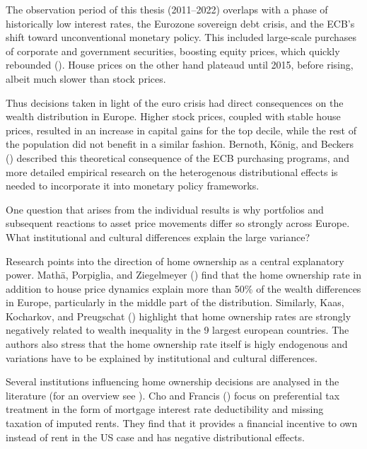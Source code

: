 \documentclass[
  a4paper,
  DIV=11,
  numbers=noendperiod]{scrartcl}
\begin{document}
The observation period of this thesis (2011--2022) overlaps with a phase
of historically low interest rates, the Eurozone sovereign debt crisis,
and the ECB's shift toward unconventional monetary policy. This included
large-scale purchases of corporate and government securities, boosting
equity prices, which quickly rebounded
(). House prices on the other hand plateaud until
2015, before rising, albeit much slower than stock prices.

Thus decisions taken in light of the euro crisis had direct consequences
on the wealth distribution in Europe. Higher stock prices, coupled with
stable house prices, resulted in an increase in capital gains for the
top decile, while the rest of the population did not benefit in a
similar fashion. Bernoth, König, and Beckers
() described this
theoretical consequence of the ECB purchasing programs, and more
detailed empirical research on the heterogenous distributional effects
is needed to incorporate it into monetary policy frameworks.

One question that arises from the individual results is why portfolios
and subsequent reactions to asset price movements differ so strongly
across Europe. What institutional and cultural differences explain the
large variance?

Research points into the direction of home ownership as a central
explanatory power. Mathä, Porpiglia, and Ziegelmeyer
() find that the home
ownership rate in addition to house price dynamics explain more than
50\% of the wealth differences in Europe, particularly in the middle
part of the distribution. Similarly, Kaas, Kocharkov, and Preugschat
() highlight
that home ownership rates are strongly negatively related to wealth
inequality in the 9 largest european countries. The authors also stress
that the home ownership rate itself is higly endogenous and variations
have to be explained by institutional and cultural differences.

Several institutions influencing home ownership decisions are analysed
in the literature (for an overview see
). Cho and Francis ()
focus on preferential tax treatment in the form of mortgage interest
rate deductibility and missing taxation of imputed rents. They find that
it provides a financial incentive to own instead of rent in the US case
and has negative distributional effects.
\end{document}
